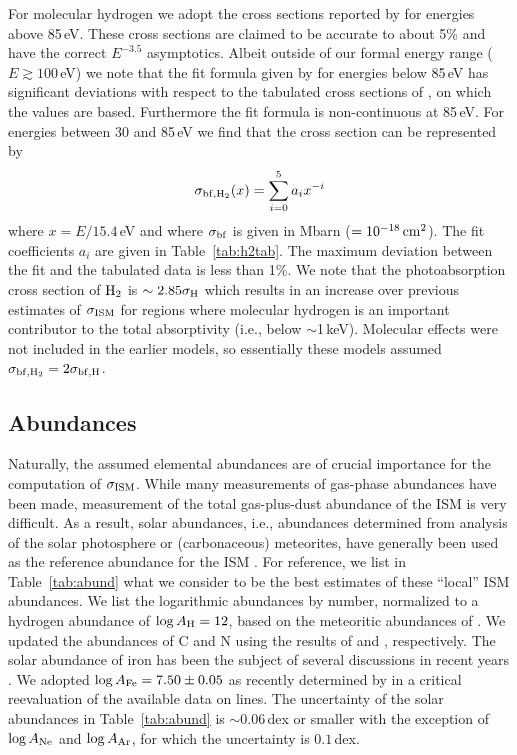 \documentclass{aastex}
\newcommand{\cm}{\ensuremath{\rm cm}}
\newcommand{\sigism}{\ensuremath{\sigma_{\rm ISM}}}
\begin{document}
For molecular hydrogen we adopt the cross sections reported by
\citet{yan:98a} for energies above 85\,eV.  These cross sections are
claimed to be accurate to about 5\% and have the correct $E^{-3.5}$
asymptotics. Albeit outside of our formal energy range ($E\gtrsim
100$\,eV) we note that the fit formula given by
\citet[eq.~18]{yan:98a} for energies below 85\,eV has significant
deviations with respect to the tabulated cross sections of
\citet{samson:94a}, on which the \citeauthor{yan:98a} values are
based. Furthermore the fit formula is non-continuous at 85\,eV. 
 For energies between 30 and 85\,eV  we find that the
cross section can be represented by
\begin{equation}\label{eq:h2fit}
\sigma_{{\rm bf},{\rm H}_2}(x)=\sum_{i=0}^5 a_i x^{-i}
\end{equation}
where $x=E/15.4$\,eV and where $\sigma_{\rm bf}$ is given in Mbarn
($=10^{-18}\,\cm^{2}$). The fit coefficients $a_i$ are given in
Table~\ref{tab:h2tab}. The maximum deviation between the fit and the
tabulated data is less than 1\%.  We note that the photoabsorption
cross section of ${\rm H}_2$ is $\sim 2.85\sigma_{\rm H}$ which
results in an increase over previous estimates of $\sigism$ for
regions where molecular hydrogen is an important contributor to the
total absorptivity (i.e., below $\sim$1\,keV).  Molecular effects were
not included in the earlier models, so essentially these models
assumed $\sigma_{{\rm bf}, {\rm H}_2}=2\sigma_{{\rm bf}, {\rm H}}$.


\subsection{Abundances}\label{sec:abundances}
Naturally, the assumed elemental abundances are of crucial importance
for the computation of $\sigism$. While many measurements of gas-phase
abundances have been made, measurement of the total gas-plus-dust
abundance of the ISM is very difficult.  As a result, solar
abundances, i.e., abundances determined from analysis of the solar
photosphere or (carbonaceous) meteorites, have generally been used as
the reference abundance for the ISM \citep[and references
therein]{anders:82a,grevesse:89a,anders:89a,shull:93a}. For reference,
we list in Table~\ref{tab:abund} what we consider to be the best
estimates of these ``local'' ISM abundances.  We list the logarithmic
abundances by number, normalized to a hydrogen abundance of $\log
A_{\rm H}=12$, based on the meteoritic abundances of
\citet{anders:89a}. We updated the abundances of C and N using the
results of \citet{grevesse:91b} and \citet{grevesse:93a},
respectively.  The solar abundance of iron has been the subject of
several discussions in recent years \citep[and references
therein]{raassen:98a,kostik:96a,biemont:91a}. We adopted $\log A_{\rm
  Fe}=7.50\pm 0.05$ as recently determined by \citet{grevesse:99a} in
a critical reevaluation of the available data on  lines.
The uncertainty of the solar abundances in Table~\ref{tab:abund} is
$\sim0.06$\,dex or smaller with the exception of $\log A_{\rm Ne}$ and
$\log A_{\rm Ar}$, for which the uncertainty is $0.1$\,dex.
\end{document}

